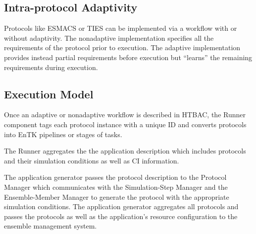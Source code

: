 
\subsection{Intra-protocol Adaptivity} 




Protocols like ESMACS or TIES can be implemented via a workflow with or
without adaptivity. The nonadaptive implementation specifies all the
requirements of the protocol prior to execution. The adaptive implementation
provides instead partial requirements before execution but ``learns'' the
remaining requirements during execution.


\subsection{Execution Model}

Once an adaptive or nonadaptive workflow is described in HTBAC, the Runner
component tags each protocol instance with a unique ID and converts protocols
into EnTK pipelines or stages of tasks. 

The Runner aggregates the  
the application description which includes protocols and their simulation 
conditions as well as CI information. 

The application generator passes the protocol description to the 
Protocol Manager which communicates with the Simulation-Step Manager and the 
Ensemble-Member Manager to generate the protocol with the appropriate 
simulation conditions. The application generator aggregates all protocols 
and passes the protocols as well as the application's resource configuration 
to the ensemble management system.  


